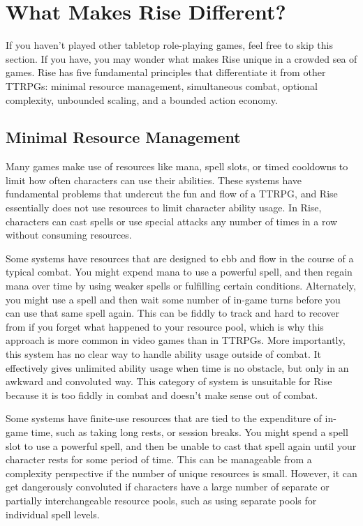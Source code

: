 \section{What Makes Rise Different?}
  If you haven't played other tabletop role-playing games, feel free to skip this section.
  If you have, you may wonder what makes Rise unique in a crowded sea of games.
  Rise has five fundamental principles that differentiate it from other TTRPGs: minimal resource management, simultaneous combat, optional complexity, unbounded scaling, and a bounded action economy.

  \subsection{Minimal Resource Management}
    Many games make use of resources like mana, spell slots, or timed cooldowns to limit how often characters can use their abilities.
    These systems have fundamental problems that undercut the fun and flow of a TTRPG, and Rise essentially does not use resources to limit character ability usage.
    In Rise, characters can cast spells or use special attacks any number of times in a row without consuming resources.

    Some systems have resources that are designed to ebb and flow in the course of a typical combat.
    You might expend mana to use a powerful spell, and then regain mana over time by using weaker spells or fulfilling certain conditions.
    Alternately, you might use a spell and then wait some number of in-game turns before you can use that same spell again.
    This can be fiddly to track and hard to recover from if you forget what happened to your resource pool, which is why this approach is more common in video games than in TTRPGs.
    More importantly, this system has no clear way to handle ability usage outside of combat.
    It effectively gives unlimited ability usage when time is no obstacle, but only in an awkward and convoluted way.
    This category of system is unsuitable for Rise because it is too fiddly in combat and doesn't make sense out of combat.

    Some systems have finite-use resources that are tied to the expenditure of in-game time, such as taking long rests, or session breaks.
    You might spend a spell slot to use a powerful spell, and then be unable to cast that spell again until your character rests for some period of time.
    This can be manageable from a complexity perspective if the number of unique resources is small.
    However, it can get dangerously convoluted if characters have a large number of separate or partially interchangeable resource pools, such as using separate pools for individual spell levels.


